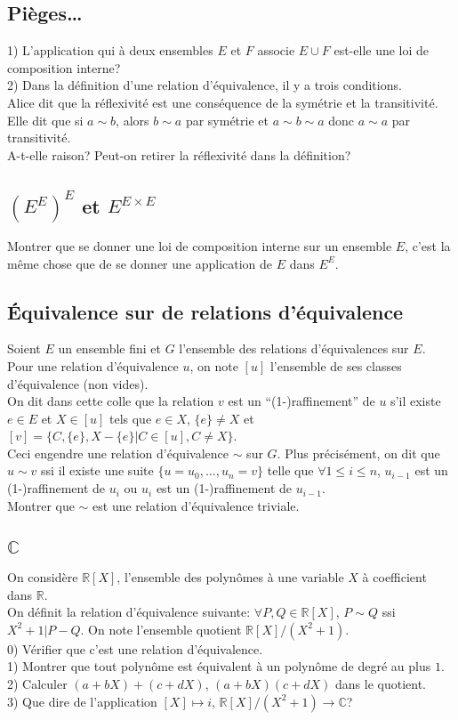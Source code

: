 \documentclass{article}
\begin{document}
\subsection{Pi\`eges\dots}
1) L'application qui \`a deux ensembles $E$ et $F$ associe $E\cup F$ est-elle une loi de composition interne?\\
2) Dans la d\'efinition d'une relation d'\'equivalence, il y a trois conditions.\\
Alice dit que la r\'eflexivit\'e est une cons\'equence de la sym\'etrie et la transitivit\'e. Elle dit que si $a\sim b$, alors $b\sim a$ par sym\'etrie et $a\sim b\sim a$ donc $a\sim a$ par transitivit\'e.\\
A-t-elle raison? Peut-on retirer la r\'eflexivit\'e dans la d\'efinition?

\subsection{$(E^{E})^{E}$ et $E^{E\times E}$}
Montrer que se donner une loi de composition interne sur un ensemble $E$, c'est la m\^eme chose que de se donner une application de $E$ dans $E^{E}$.

\subsection{\'Equivalence sur de relations d'\'equivalence}
Soient $E$ un ensemble fini et $G$ l'ensemble des relations d'\'equivalences sur $E$. Pour une relation d'\'equivalence $u$, on note $[u]$ l'ensemble de ses classes d'\'equivalence (non vides).\\
On dit dans cette colle que la relation $v$ est un ``(1-)raffinement'' de $u$ s'il existe $e\in E$ et $X\in [u]$ tels que $e\in X$, $\{e\}\neq X$ et $[v]=\{C,\{e\},X-\{e\}|C\in[u], C\neq X\}$.\\
Ceci engendre une relation d'\'equivalence $\sim$ sur $G$. Plus pr\'ecis\'ement, on dit que $u\sim v$ ssi il existe une suite $\{u=u_0,\dots,u_n=v\}$ telle que $\forall 1\leq i\leq n$, $u_{i-1}$ est un (1-)raffinement de $u_i$ ou $u_i$ est un (1-)raffinement de $u_{i-1}$.\\
Montrer que $\sim$ est une relation d'\'equivalence triviale.

\subsection{$\mathbb{C}$}
On consid\`ere $\mathbb{R}[X]$, l'ensemble des polyn\^omes \`a une variable $X$ \`a coefficient dans $\mathbb{R}$.\\
On d\'efinit la relation d'\'equivalence suivante: $\forall P,Q\in\mathbb{R}[X]$, $P\sim Q$ ssi $X^2+1|P-Q$. On note l'ensemble quotient $\mathbb{R}[X]/(X^2+1)$.\\
0) V\'erifier que c'est une relation d'\'equivalence.\\
1) Montrer que tout polyn\^ome est \'equivalent \`a un polyn\^ome de degr\'e au plus $1$.\\
2) Calculer $(a+bX)+(c+dX)$, $(a+bX)(c+dX)$ dans le quotient.\\
3) Que dire de l'application $[X]\mapsto i$, $\mathbb{R}[X]/(X^2+1)\to\mathbb{C}$?
\end{document}
